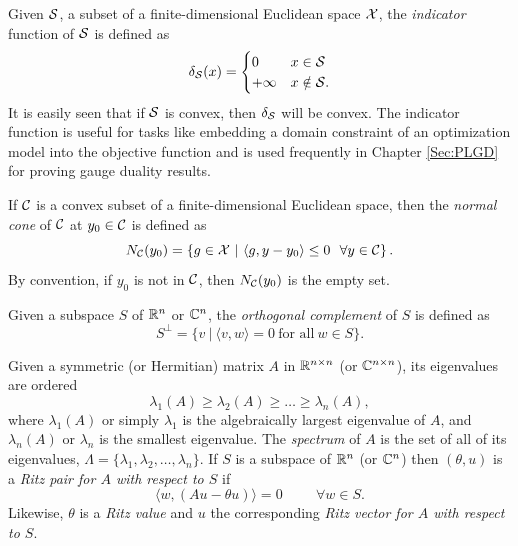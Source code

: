 Given ${\mathcal S}$, a subset of a finite-dimensional Euclidean space ${\mathcal X}$, the \textit{indicator} function of ${\mathcal S}$ is defined as
\begin{equation}  			\label{Def:indicator_function}
\delta_{\mathcal S}(x) =
	\begin{cases}
		0		&	x \in {\mathcal S}		\\
		+\infty		&	x \notin {\mathcal S}.
	\end{cases}
\end{equation}
It is easily seen that if ${\mathcal S}$ is convex, then $\delta_{\mathcal S}$ will be convex.  
The indicator function is useful for tasks like embedding a domain constraint of an optimization model into the objective function and is used frequently in Chapter \ref{Sec:PLGD} for proving gauge duality results.

If ${\mathcal C}$ is a convex subset of a finite-dimensional Euclidean space, then the \textit{normal cone} of ${\mathcal C}$ at $y_0 \in {\mathcal C}$ is defined as
\begin{equation} 			\label{Def:normal_cone}
N_{\mathcal C}(y_0) = \left\{ g \in {\mathcal X} \ | \ \langle g, y - y_0 \rangle \leq 0 \ \ \forall y \in {\mathcal C} \right\}.
\end{equation}
By convention, if $y_0$ is not in ${\mathcal C}$, then $N_{\mathcal C}(y_0)$ is the empty set.

Given a subspace $S$ of ${\mathbb R}^n$ or ${\mathbb C}^n$, the \textit{orthogonal complement} of $S$ is defined as
\begin{equation}
S^\perp = \{ v \ | \ \langle v, w \rangle = 0 \ \text{for all} \ w \in S \}.
\end{equation}


Given a symmetric (or Hermitian) matrix $A$ in ${\mathbb R}^{n \times n}$ (or ${\mathbb C}^{n \times n}$), its eigenvalues are ordered
\begin{equation}			\label{Def:eigenvalues}
\lambda_1(A) \geq \lambda_2(A) \geq \ldots \geq \lambda_n(A),
\end{equation}
where $\lambda_1(A)$ or simply $\lambda_1$ is the algebraically largest eigenvalue of $A$, and $\lambda_n(A)$ or $\lambda_n$ is the smallest eigenvalue.  The \textit{spectrum} of $A$ is the set of all of its eigenvalues, $\Lambda = \{ \lambda_1, \lambda_2, \ldots, \lambda_n\}$.
If $S$ is a subspace of ${\mathbb R}^n$ (or ${\mathbb C}^n$) then $(\theta, u)$ is a \textit{Ritz pair for $A$ with respect to $S$} if 
\begin{equation} 			\label{Def:Ritz_pair_val_vec}
\langle w, (Au-\theta u) \rangle = 0 \hspace{1cm} \forall w \in S.
\end{equation}
Likewise, $\theta$ is a \textit{Ritz value} and $u$ the corresponding \textit{Ritz vector for $A$ with respect to $S$}.

